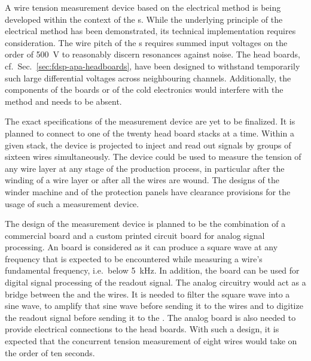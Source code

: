 A wire tension measurement device based on the electrical method is being developed within the context of the  s. While the underlying principle of the electrical method has been demonstrated, its technical implementation requires consideration. The wire pitch of the s requires summed input voltages on the order of \SI{500}{V} to reasonably discern resonances against noise. The head boards, cf.\ Sec.~\ref{sec:fdsp-apa-headboards}, have been designed to withstand temporarily such large differential voltages across neighbouring channels. Additionally, the components of the  boards or of the cold electronics would interfere with the method and needs to be absent.

The exact specifications of the measurement device are yet to be finalized. It is planned to connect to one of the twenty head board stacks at a time. Within a given stack, the device is projected to inject and read out signals by groups of sixteen wires simultaneously. The device could be used to measure the tension of any wire layer at any stage of the production process, in particular after the winding of a wire layer or after all the wires are wound. The designs of the winder machine and of the  protection panels have clearance provisions for the usage of such a measurement device.

The design of the measurement device is planned to be the combination of a commercial  board and a custom printed circuit board for analog signal processing. An  board is considered as it can produce a square wave at any frequency that is expected to be encountered while measuring a wire's fundamental frequency, i.e.\ below \SI{5}{kHz}. In addition, the  board can be used for digital signal processing of the readout signal. The analog circuitry would act as a bridge between the  and the  wires. It is needed to filter the square wave into a sine wave, to amplify that sine wave before sending it to the wires and to digitize the readout signal before sending it to the . The analog board is also needed to provide electrical connections to the head boards. With such a design, it is expected that the concurrent tension measurement of eight wires would take on the order of ten seconds.

